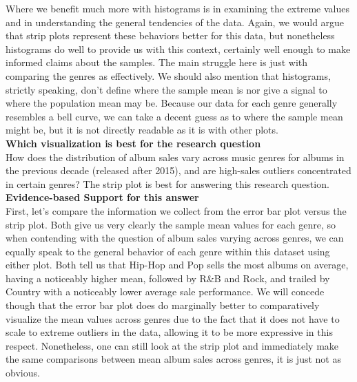 Where we benefit much more with histograms is in examining the extreme values and in understanding the general tendencies of the data. Again, we would argue that strip plots represent these behaviors better for this data, but nonetheless histograms do well to provide us with this context, certainly well enough to make informed claims about the samples. The main struggle here is just with comparing the genres as effectively. We should also mention that histograms, strictly speaking, don't define where the sample mean is nor give a signal to where the population mean may be. Because our data for each genre generally resembles a bell curve, we can take a decent guess as to where the sample mean might be, but it is not directly readable as it is with other plots.\\

\textbf{Which visualization is best for the research question}\\

How does the distribution of album sales vary across music genres for albums in the previous decade (released after 2015), and are high-sales outliers concentrated in certain genres? The strip plot is best for answering this research question.\\

\textbf{Evidence-based Support for this answer}\\

First, let's compare the information we collect from the error bar plot versus the strip plot. Both give us very clearly the sample mean values for each genre, so when contending with the question of album sales varying across genres, we can equally speak to the general behavior of each genre within this dataset using either plot. Both tell us that Hip-Hop and Pop sells the most albums on average, having a noticeably higher mean, followed by R\&B and Rock, and trailed by Country with a noticeably lower average sale performance. We will concede though that the error bar plot does do marginally better to comparatively visualize the mean values across genres due to the fact that it does not have to scale to extreme outliers in the data, allowing it to be more expressive in this respect. Nonetheless, one can still look at the strip plot and immediately make the same comparisons between mean album sales across genres, it is just not as obvious.\\


